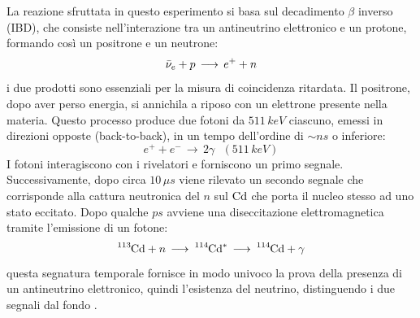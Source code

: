 La reazione sfruttata in questo esperimento si basa sul decadimento $\beta$ inverso (IBD), che consiste nell'interazione tra un antineutrino elettronico e un protone, formando così un positrone e un neutrone:
\begin{equation}
    \Bar{\nu}_e+p\,\longrightarrow\,e^++n
    \label{eq:Beta inverso}
\end{equation}
i due prodotti sono essenziali per la misura di coincidenza ritardata. Il positrone, dopo aver perso energia, si annichila a riposo con un elettrone presente nella materia. Questo processo produce due fotoni da $511\,\unit{keV}$ ciascuno, emessi in direzioni opposte (back-to-back), in un tempo dell'ordine di $\sim$$\unit{ns}$ o inferiore:
\begin{equation}
    e^++e^-\,\longrightarrow\,2\gamma\,\,\,\,(511\,\unit{keV})
\end{equation}
I fotoni interagiscono con i rivelatori e forniscono un primo segnale. Successivamente, dopo circa $10\,\mu\unit{s}$ viene rilevato un secondo segnale che corrisponde alla cattura neutronica del $n$ sul $\ce{Cd}$ che porta il nucleo stesso ad uno stato eccitato. Dopo qualche $\unit{ps}$ avviene una diseccitazione elettromagnetica tramite l'emissione di un fotone: 
\begin{equation}
    \ce{^{113}Cd}+n\,\longrightarrow\,\ce{^{114}Cd}^*\,\longrightarrow\,\ce{^{114}Cd}+\gamma
\end{equation}
questa segnatura temporale fornisce in modo univoco la prova della presenza di un antineutrino elettronico, quindi l'esistenza del neutrino, distinguendo i due segnali dal fondo \cite{alma991017639394506031}. 
